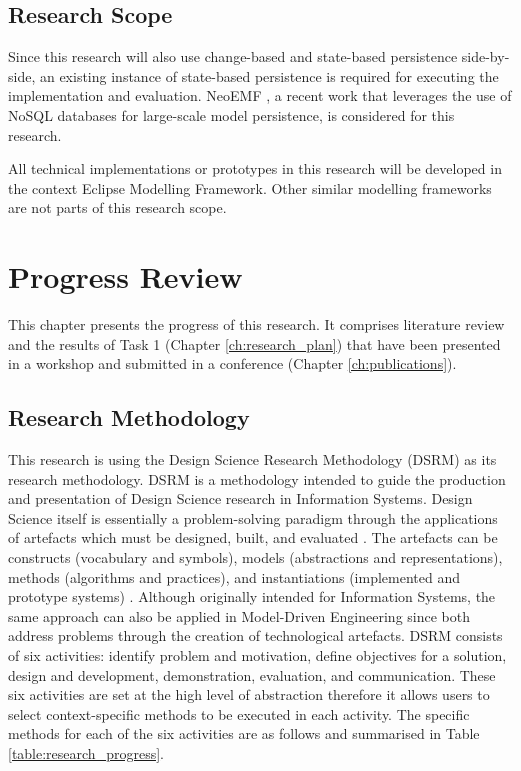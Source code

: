 \documentclass[12pt, a4paper]{report} \usepackage[titletoc]{appendix}
\begin{document}
\section{Research Scope}
\label{sec:research_scope}
Since this research will also use change-based and state-based persistence side-by-side, an existing instance of state-based persistence is required for executing the implementation and evaluation. NeoEMF \cite{daniel2016neoemf}, a recent work that leverages the use of NoSQL databases for large-scale model persistence, is considered for this research. 

All technical implementations or prototypes in this research will be developed in the context Eclipse Modelling Framework. Other similar modelling frameworks are not parts of this research scope. 

\chapter{Progress Review}
\label{ch:progress_review}
This chapter presents the progress of this research. It comprises literature review and the results of Task 1 (Chapter \ref{ch:research_plan}) that have been presented in a workshop and submitted in a conference (Chapter \ref{ch:publications}). 

\section{Research Methodology}
\label{sec:research_methodology}
This research is using the Design Science Research Methodology (DSRM) \cite{peffers2007design} as its research methodology. DSRM is a methodology intended to guide the production and presentation of Design Science research in Information Systems. Design Science itself is essentially a problem-solving paradigm through the applications of artefacts which must be designed, built, and evaluated \cite{hevner2010design}. The artefacts can be constructs (vocabulary and symbols), models (abstractions and representations), methods (algorithms and practices), and instantiations (implemented and prototype systems) \cite{hevner2004design}. Although originally intended for Information Systems, the same approach can also be applied in Model-Driven Engineering since both address problems through the creation of technological artefacts. DSRM consists of six activities: identify problem and motivation, define objectives for a solution, design and development, demonstration, evaluation, and communication. These six activities are set at the high level of abstraction therefore it allows users to select context-specific methods to be executed in each activity. The specific methods for each of the six activities are as follows and summarised in Table \ref{table:research_progress}.
\end{document}
